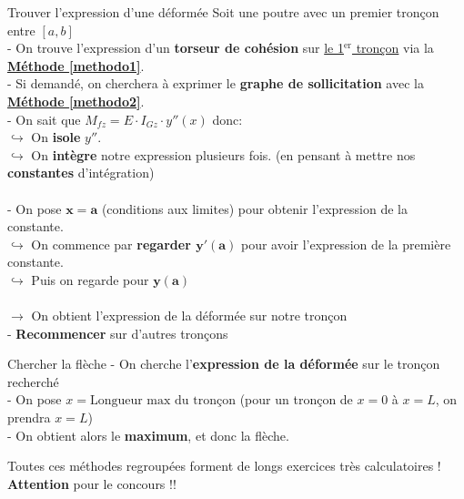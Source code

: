 \documentclass{article}
\begin{document}
{\begin{méthode}[label=methodo3]{Trouver l'expression d'une déformée}
Soit une poutre avec un premier tronçon entre $[a,b]$\\
- On trouve l'expression d'un \textbf{torseur de cohésion} sur \underline{le 1$^\text{er}$ tronçon} via la \hyperref[methodo1]{\textbf{\textcolor{myorange}{Méthode \ref*{methodo1}}}}.\\
- Si demandé, on cherchera à exprimer le \textbf{graphe de sollicitation} avec la \hyperref[methodo2]{\textbf{\textcolor{myorange}{Méthode \ref*{methodo2}}}}.\\
- On sait que $M_{fz}=E\cdot I_{Gz}\cdot y''(x)$ donc:\\
\hspace*{10pt}$\hookrightarrow$ On \textbf{isole} $y''$.\\
\hspace*{10pt}$\hookrightarrow$ On \textbf{intègre} notre expression plusieurs fois. (en pensant à mettre nos \textbf{constantes} d'intégration)\\
\\
- On pose $\bm{x=a}$ (conditions aux limites) pour obtenir l'expression de la constante.\\
\hspace*{10pt}$\hookrightarrow$ On commence par \textbf{regarder $\bm{y'(a)}$} pour avoir l'expression de la première constante.\\
\hspace*{10pt}$\hookrightarrow$ Puis on regarde pour $\bm{y(a)}$\\
\\
$\to$ On obtient l'expression de la déformée sur notre tronçon\\
- \textbf{Recommencer} sur d'autres tronçons
\end{méthode}
\begin{méthode}{Chercher la flèche}
- On cherche l'\textbf{expression de la déformée} sur le tronçon recherché\\
- On pose $x= \textrm{Longueur max du tronçon}$ (pour un tronçon de $x=0$ à $x=L$, on prendra $x=L$)\\
- On obtient alors le \textbf{maximum}, et donc la flèche.
\end{méthode}
\noindent Toutes ces méthodes regroupées forment de longs exercices très calculatoires ! \textbf{Attention} pour le concours !!\pagebreak
}
\end{document}
